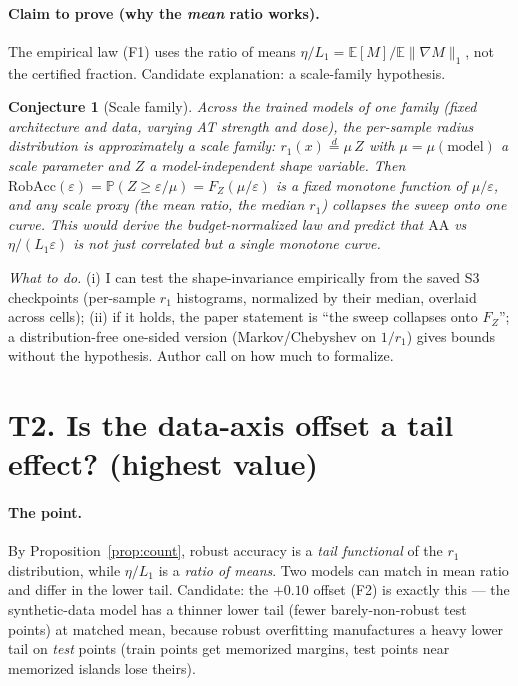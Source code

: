\documentclass[11pt]{article}
\newtheorem{conjecture}{Conjecture}
\theoremstyle{definition}
\newcommand{\E}{\mathbb{E}}
\newcommand{\Prob}{\mathbb{P}}
\begin{document}
\paragraph{Claim to prove (why the \emph{mean} ratio works).}
The empirical law (F1) uses the ratio of means $\eta/L_1=\E[M]/\E\|\nabla M\|_1$, not the certified
fraction. Candidate explanation: a scale-family hypothesis.

\begin{conjecture}[Scale family]\label{conj:scale}
Across the trained models of one family (fixed architecture and data, varying AT strength and dose),
the per-sample radius distribution is approximately a scale family:
$r_1(x)\overset d=\mu\,Z$ with $\mu=\mu(\text{model})$ a scale parameter and $Z$ a
model-independent shape variable. Then
$\mathrm{RobAcc}(\varepsilon)=\Prob(Z\ge\varepsilon/\mu)=F_Z(\mu/\varepsilon)$ is a fixed monotone
function of $\mu/\varepsilon$, and any scale proxy (the mean ratio, the median $r_1$) collapses the
sweep onto one curve. This would \emph{derive} the budget-normalized law and predict that
$\mathrm{AA}$ vs $\eta/(L_1\varepsilon)$ is not just correlated but a single monotone curve.
\end{conjecture}
\noindent\emph{What to do.} (i) I can test the shape-invariance empirically from the saved S3
checkpoints (per-sample $r_1$ histograms, normalized by their median, overlaid across cells); (ii)
if it holds, the paper statement is ``the sweep collapses onto $F_Z$''; a distribution-free
one-sided version (Markov/Chebyshev on $1/r_1$) gives bounds without the hypothesis. Author call on
how much to formalize.

\section*{T2. Is the data-axis offset a tail effect? (highest value)}

\paragraph{The point.} By Proposition~\ref{prop:count}, robust accuracy is a \emph{tail
functional} of the $r_1$ distribution, while $\eta/L_1$ is a \emph{ratio of means}. Two models can
match in mean ratio and differ in the lower tail. Candidate: the $+0.10$ offset (F2) is exactly
this — the synthetic-data model has a thinner lower tail (fewer barely-non-robust test points) at
matched mean, because robust overfitting manufactures a heavy lower tail on \emph{test} points
(train points get memorized margins, test points near memorized islands lose theirs).
\end{document}
